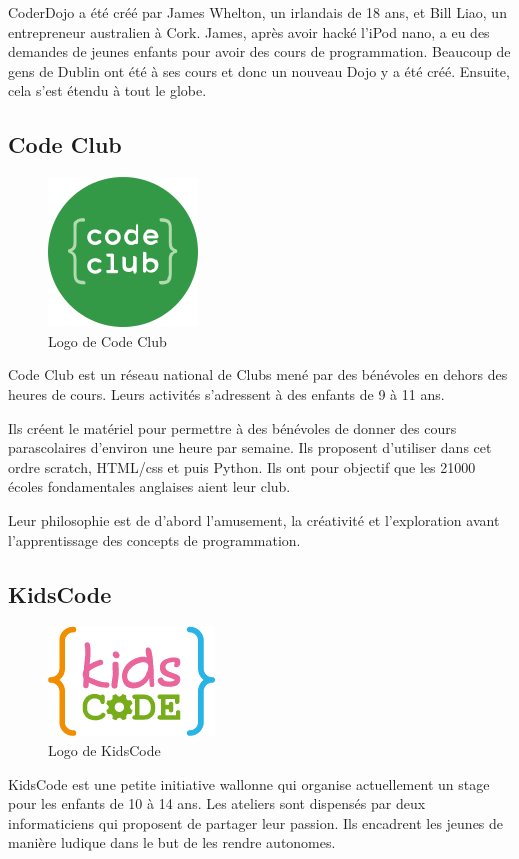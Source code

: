 CoderDojo a été créé par James Whelton, un irlandais de 18 ans, et Bill Liao, un entrepreneur australien à Cork. James, après avoir hacké l'iPod nano, a eu des demandes de jeunes enfants pour avoir des cours de programmation. Beaucoup de gens de Dublin ont été à ses cours et donc un nouveau Dojo y a été créé. Ensuite, cela s'est étendu à tout le globe.

\subsection{Code Club}
\begin{figure}[!ht]
  \begin{center}
    \includegraphics[scale=0.3]{content/5-related_work/images/club}
    \caption{Logo de Code Club}
    \label{fig:code club}
  \end{center}
\end{figure}
Code Club\cite{codeclub-about} est un réseau national de Clubs mené par des bénévoles en dehors des heures de cours. Leurs activités s'adressent à des enfants de 9 à 11 ans.

Ils créent le matériel pour permettre à des bénévoles de donner des cours parascolaires d'environ une heure par semaine. Ils proposent d'utiliser dans cet ordre scratch, HTML/css et puis Python. Ils ont pour objectif que les 21000 écoles fondamentales anglaises aient leur club.

Leur philosophie est de d'abord l'amusement, la créativité et l'exploration avant l'apprentissage des concepts de programmation.

\subsection{KidsCode}
\label{init-kidscode}
\begin{figure}[!ht]
  \begin{center}
    \includegraphics[scale=0.5]{content/5-related_work/images/kidscode}
    \caption{Logo de KidsCode}
    \label{fig:kidscode}
  \end{center}
\end{figure}
KidsCode \cite{kidscode} est une petite initiative wallonne qui organise actuellement un stage pour les enfants de 10 à 14 ans. Les ateliers sont dispensés par deux informaticiens qui proposent de partager leur passion. Ils encadrent les jeunes de manière ludique dans le but de les rendre autonomes.

